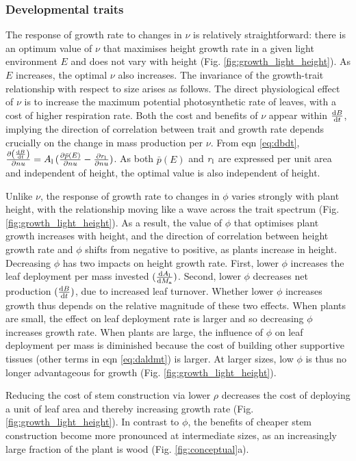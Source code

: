 \documentclass[9pt,twocolumn,twoside]{pnas-new}
\begin{document}
\subsubsection{Developmental traits}  The response of growth rate to changes in $\nu$ is relatively straightforward: there is an optimum value of $\nu$ that maximises height growth rate in a given light environment $E$ and does not vary with height (Fig. \ref{fig:growth_light_height}). As $E$ increases, the optimal $\nu$ also increases. The invariance of the growth-trait relationship with respect to size arises as follows. The direct physiological effect of $\nu$ is to increase the maximum potential photosynthetic rate of leaves, with a cost of higher respiration rate. Both the cost and benefits of $\nu$ appear within $\frac{ {\rm d}B} {{\rm d}t}$, implying the direction of correlation between trait and growth rate depends crucially on the change in mass production per $\nu$.
From eqn \ref{eq:dbdt}, $\frac{\partial \left( \frac{ {\rm d}B} {{\rm d}t}\right)}{\partial nu} = A_{\rm l} \, (\frac{ \partial \bar{p}(E)}{\partial nu}  - \frac{ \partial r_{\rm l}}{\partial nu} )$. As both $\bar{p}(E)$ and $r_{\rm l}$ are expressed per unit area and independent of height, the optimal value is also independent of height.

Unlike $\nu$, the response of growth rate to changes in $\phi$ varies strongly with plant height, with the relationship moving like a wave across the trait spectrum (Fig. \ref{fig:growth_light_height}). As a result, the value of $\phi$ that optimises plant growth increases with height, and the direction of correlation between height growth rate and $\phi$ shifts from negative to positive, as plants increase in height. Decreasing $\phi$ has two impacts on height growth rate. First, lower $\phi$ increases the leaf deployment per mass invested $(\frac{{\rm d}A_{\rm l}}{{\rm d}M_{\rm a}})$. Second, lower $\phi$ decreases net production $(\frac{{\rm d}B}{{\rm d}t})$, due to increased leaf turnover. Whether lower $\phi$ increases growth thus depends on the relative magnitude of these two effects. When plants are small, the effect on leaf deployment rate is larger and so decreasing $\phi$ increases growth rate. When plants are large, the influence of $\phi$ on leaf deployment per mass is diminished because the cost of building other supportive tissues (other terms in eqn \ref{eq:daldmt}) is larger. At larger sizes, low $\phi$ is thus no longer advantageous for growth (Fig. \ref{fig:growth_light_height}).

Reducing the cost of stem construction via lower $\rho$ decreases the cost of deploying a unit of leaf area and thereby increasing growth rate (Fig. \ref{fig:growth_light_height}). In contrast to $\phi$, the benefits of cheaper stem construction become more pronounced at intermediate sizes, as an increasingly large fraction of the plant is wood (Fig. \ref{fig:conceptual}a).
\end{document}

